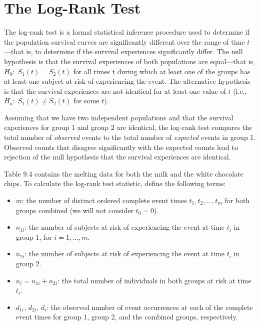 \documentclass[
]{report}
\providecommand{\tightlist}{%
  \setlength{\itemsep}{0pt}\setlength{\parskip}{0pt}}
\begin{document}
\section*{The Log-Rank Test}\label{the-log-rank-test}

The log-rank test is a formal statistical inference procedure used to determine if the population survival curves are significantly different over the range of time \(t\)---that is, to determine if the survival experiences significantly differ. The null hypothesis is that the survival experiences of both populations are equal---that is, \(H_0:\;S_1(t) = S_2(t)\) for all times t during which at least one of the groups has at least one subject at risk of
experiencing the event. The alternative hypothesis is that the survival experiences are not identical for at least one value of \(t\) (i.e., \(H_a:\;S_1(t)\neq S_2(t)\) for some \(t\)).

Assuming that we have two independent populations and that the survival experiences for group 1 and group 2 are identical, the log-rank test compares the total number of \emph{observed} events to the total number of \emph{expected} events in group 1. Observed counts that disagree significantly with the expected counts lead to rejection of the null hypothesis that the survival experiences are identical.

Table 9.4 contains the melting data for both the milk and the white chocolate chips. To calculate the log-rank test statistic, define the following terms:

\begin{itemize}
\tightlist
\item
  \(m\): the number of distinct ordered complete event times \(t_1, t_2, \dots, t_m\) for both groups combined (we will not consider \(t_0 = 0\)).
\item
  \(n_{1i}\): the number of subjects at risk of experiencing the event at time \(t_i\) in group 1, for \(i = 1,\dots,m\).\\
\item
  \(n_{2i}\): the number of subjects at risk of experiencing the event at time \(t_i\) in group 2.\\
\item
  \(n_i = n_{1i} + n_{2i}\): the total number of individuals in both groups at risk at time \(t_i\).\\
\item
  \(d_{1i},\,d_{2i},\,d_i\): the observed number of event occurrences at each of the complete event times for group 1, group 2, and the combined groups, respectively.
\end{itemize}
\end{document}
